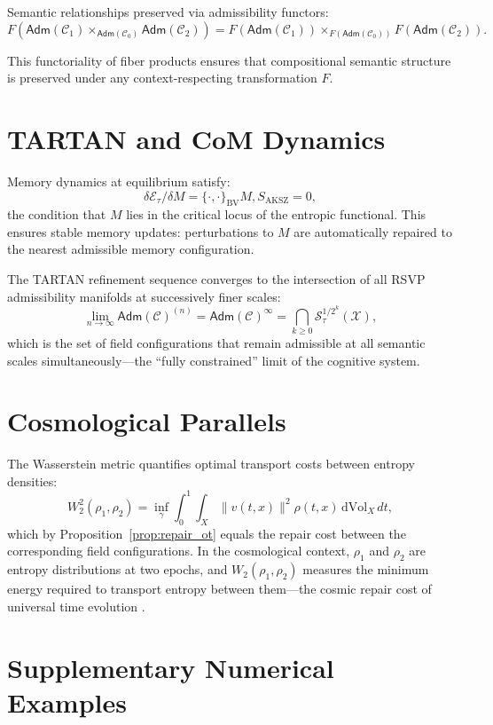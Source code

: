 \documentclass[a4paper,12pt]{article}
\theoremstyle{definition}
\newcommand{\Stau}{\mathcal{S}_\tau}
\newcommand{\BV}{\{\cdot,\cdot\}_{\mathrm{BV}}}
\newcommand{\X}{\mathcal{X}}
\newcommand{\Wtwo}{W_2}
\newcommand{\Adm}{\mathsf{Adm}}
\begin{document}
Semantic relationships preserved via admissibility functors:
\[
F(\Adm(\mathcal{C}_1) \times_{\Adm(\mathcal{C}_0)} \Adm(\mathcal{C}_2)) = F(\Adm(\mathcal{C}_1)) \times_{F(\Adm(\mathcal{C}_0))} F(\Adm(\mathcal{C}_2)).
\]

This functoriality of fiber products ensures that compositional semantic structure is preserved under any context-respecting transformation $F$.

\section{TARTAN and CoM Dynamics}
\label{app:tartan}

Memory dynamics at equilibrium satisfy:
\[
\delta \mathcal{E}_\tau / \delta M = \BV{M, S_{\mathrm{AKSZ}}} = 0,
\]
the condition that $M$ lies in the critical locus of the entropic functional. This ensures stable memory updates: perturbations to $M$ are automatically repaired to the nearest admissible memory configuration.

The TARTAN refinement sequence converges to the intersection of all RSVP admissibility manifolds at successively finer scales:
\[
\lim_{n \to \infty} \Adm(\mathcal{C})^{(n)} = \Adm(\mathcal{C})^\infty = \bigcap_{k \geq 0} \Stau^{1/2^k}(\X),
\]
which is the set of field configurations that remain admissible at all semantic scales simultaneously—the ``fully constrained'' limit of the cognitive system.

\section{Cosmological Parallels}
\label{app:cosmology}

The Wasserstein metric quantifies optimal transport costs between entropy densities:
\[
\Wtwo^2(\rho_1, \rho_2) = \inf_\gamma \int_0^1 \int_X \|v(t,x)\|^2 \rho(t,x) \, \mathrm{dVol}_X \, dt,
\]
which by Proposition~\ref{prop:repair_ot} equals the repair cost between the corresponding field configurations. In the cosmological context, $\rho_1$ and $\rho_2$ are entropy distributions at two epochs, and $\Wtwo(\rho_1, \rho_2)$ measures the minimum energy required to transport entropy between them—the cosmic repair cost of universal time evolution \cite{Villani2008, Verlinde2011}.

\section{Supplementary Numerical Examples}
\label{app:G}
\end{document}
